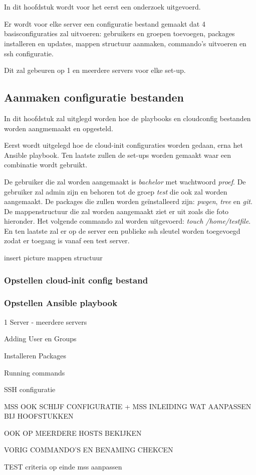 \chapter{}
\label{ch:basisconf}
In dit hoofdstuk wordt voor het eerst een onderzoek uitgevoerd. 

Er wordt voor elke server een configuratie bestand gemaakt dat 4 basisconfiguraties zal uitvoeren: gebruikers en groepen toevoegen, packages installeren en updates, mappen structuur aanmaken, commando's uitvoeren en ssh configuratie. 

Dit zal gebeuren op 1 en meerdere servers voor elke set-up. 

\section{Aanmaken configuratie bestanden}
In dit hoofdstuk zal uitglegd worden hoe de playbooks en cloudconfig bestanden worden aangmemaakt en opgesteld. 

Eerst wordt uitgelegd hoe de cloud-init configuraties worden gedaan, erna het Ansible playbook. Ten laatste zullen de set-ups worden gemaakt waar een combinatie wordt gebruikt.

De gebruiker die zal worden aangemaakt is \textit{bachelor} met wachtwoord \textit{proef}. De gebruiker zal admin zijn en behoren tot de groep \textit{test} die ook zal worden aangemaakt. De packages die zullen worden geïnstalleerd zijn: \textit{pwgen}, \textit{tree} en \textit{git}. De mappenstructuur die zal worden aangemaakt ziet er uit zoals die foto hieronder. Het volgende commando zal worden uitgevoerd: \textit{touch /home/testfile}. En ten laatste zal er op de server een publieke ssh sleutel worden toegevoegd zodat er toegang is vanaf een test server.

insert picture mappen structuur
\subsection{Opstellen cloud-init config bestand}


\subsection{Opstellen Ansible playbook}



1 Server - meerdere servers

Adding User en Groups

Installeren Packages

Running commands

SSH configuratie

MSS OOK SCHIJF CONFIGURATIE + MSS INLEIDING WAT AANPASSEN BIJ HOOFSTUKKEN

OOK OP MEERDERE HOSTS BEKIJKEN

VORIG COMMANDO'S EN BENAMING CHEKCEN

TEST criteria op einde mss aanpassen